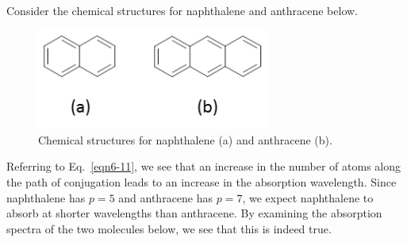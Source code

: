 Consider the chemical structures for naphthalene and anthracene below.  
\begin{figure}[h]
	\centering
	\includegraphics[width=3.0in]{./figures/Topic6/Fig6-10.png}
	\caption{Chemical structures for naphthalene (a) and anthracene (b).}
	\label{Fig6-10}
\end{figure}  
Referring to Eq.~\ref{eqn6-11}, we see that an increase in the number of atoms along the path of conjugation leads to an increase in the absorption wavelength.  Since naphthalene has $p = 5$ and anthracene has $p = 7$, we expect naphthalene to absorb at shorter wavelengths than anthracene.  By examining the absorption spectra of the two molecules below, we see that this is indeed true.
